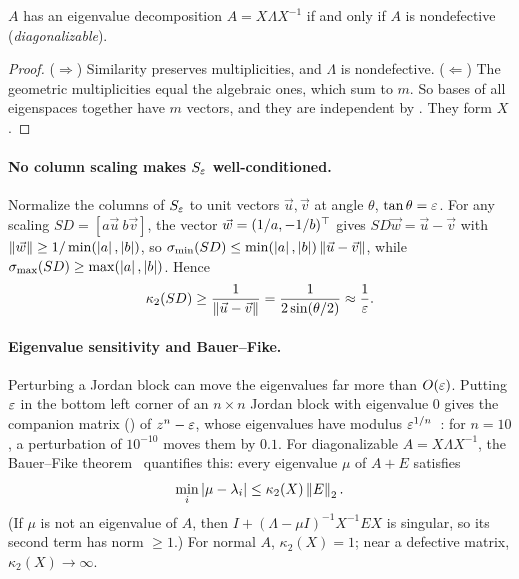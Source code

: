 \begin{theorem}[{\cite[Thm.~24.5]{TB}}]
  \label{thm:nondefective}
  $A$ has an eigenvalue decomposition $A = X\Lambda X^{-1}$ if and only if $A$ is nondefective (\emph{diagonalizable}).
\end{theorem}

\begin{proof}
  ($\Rightarrow$) Similarity preserves multiplicities, and $\Lambda$ is nondefective. ($\Leftarrow$) The geometric multiplicities equal the algebraic ones, which sum to $m$. So bases of all eigenspaces together have $m$ vectors, and they are independent by . They form $X$.
\end{proof}

\paragraph{No column scaling makes \texorpdfstring{$S_\varepsilon$}{S\_eps} well-conditioned.}
\label{sec:jordan-scaling}
Normalize the columns of $S_\varepsilon$ to unit vectors $\vec{u}, \vec{v}$ at angle $\theta$, $\tan\theta = \varepsilon$. For any scaling $SD = [a\vec{u}\ b\vec{v}]$, the vector $\vec{w} = (1/a, -1/b)^\top$ gives $SD\vec{w} = \vec{u} - \vec{v}$ with $\left\lVert \vec{w} \right\rVert \ge 1/\min(\left\lvert a \right\rvert, \left\lvert b \right\rvert)$, so $\sigma_{\min}(SD) \le \min(\left\lvert a \right\rvert, \left\lvert b \right\rvert)\left\lVert \vec{u} - \vec{v} \right\rVert$, while $\sigma_{\max}(SD) \ge \max(\left\lvert a \right\rvert, \left\lvert b \right\rvert)$. Hence
\begin{equation*}
  \kappa_2(SD) \ge \frac{1}{\left\lVert \vec{u} - \vec{v} \right\rVert} = \frac{1}{2\sin(\theta/2)} \approx \frac{1}{\varepsilon}.
\end{equation*}

\paragraph{Eigenvalue sensitivity and Bauer--Fike.} Perturbing a Jordan block can move the eigenvalues far more than $O(\varepsilon)$. Putting $\varepsilon$ in the bottom left corner of an $n \times n$ Jordan block with eigenvalue $0$ gives the companion matrix () of $z^n - \varepsilon$, whose eigenvalues have modulus $\varepsilon^{1/n}$~\cite[Example~4.4]{Demmel}: for $n = 10$, a perturbation of $10^{-10}$ moves them by $0.1$. For diagonalizable $A = X\Lambda X^{-1}$, the Bauer--Fike theorem~\cite[\S4.3]{Demmel} quantifies this: every eigenvalue $\mu$ of $A + E$ satisfies
\begin{equation}
  \min_i\left\lvert \mu - \lambda_i \right\rvert \le \kappa_2(X)\left\lVert E \right\rVert_2.
\end{equation}
(If $\mu$ is not an eigenvalue of $A$, then $I + (\Lambda - \mu I)^{-1}X^{-1}EX$ is singular, so its second term has norm $\ge 1$.) For normal $A$, $\kappa_2(X) = 1$; near a defective matrix, $\kappa_2(X) \to \infty$.
